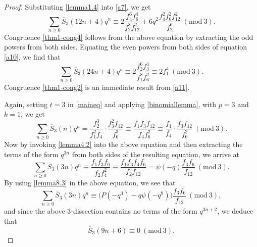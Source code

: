 \documentclass[10pt,a4paper]{amsart}
\begin{document}
\begin{proof}
Substituting \eqref{lemma1.4} into \eqref{a7}, we get
\begin{equation}
\sum_{n \geq 0} \overline{S}_{3}(12n+4) q^{n} \equiv  2 \dfrac{f_{4}^{6} f_{6}^{4}}{f_{2}^{8} f_{12}^{2}} + 6 q^{2}  \dfrac{f_{4}^{2} f_{6}^{2} f_{12}^{2}}{f_{2}^{6}}  \ (\mathrm{mod} \ 3).  \label{a10}
\end{equation}
Congruence \eqref{thm1-cong4} follows from the above equation by extracting the odd powers from both sides. Equating the even powers from both sides of equation \eqref{a10}, we find that
\begin{equation}
\sum_{n \geq 0} \overline{S}_{3}(24n+4) q^{n} \equiv  2 \dfrac{f_{2}^{6} f_{3}^{4}}{f_{1}^{8} f_{6}^{2}} \equiv 2f_{1}^{4}  \ (\mathrm{mod} \ 3).  \label{a11}
\end{equation}
Congruence \eqref{thm1-cong2} is an immediate result from \eqref{a11}.

Again, setting $t=3$ in \eqref{maineq} and applying \eqref{binomiallemma}, with $p=3$ and $k=1$, we get 
\begin{equation*}
\sum_{n \geq 0} \overline{S}_{3}(n) q^{n} = \frac{f_{2}^3 }{f_{1}^2 f_{4}} \cdot \frac{f_{3}^2 f_{12}}{f_{6}^3} \equiv \frac{f_{1} f_{3} f_{12}}{f_{4} f_{6}^2} \equiv \frac{f_{1}}{f_{4}} \cdot  \frac{f_{3} f_{12}}{f_{6}^2} \ (\mathrm{mod} \ 3).
\end{equation*}
Now by invoking \eqref{lemma4.2} into the above equation and then extracting the terms of the form $q^{3n}$ from both sides of the resulting equation, we arrive at
\begin{equation*}
\sum_{n \geq 0} \overline{S}_{3}(3n) q^{n} \equiv \frac{f_1 f_3 f_6}{f_2 f_4^2} \equiv \frac{f_1 f_3 f_4 f_6}{f_2 f_{12}} = \psi(-q) \frac{f_3 f_6}{f_{12}} \ (\mathrm{mod} \ 3).
\end{equation*}
By using \eqref{lemma8.3} in the above equation, we see that
\begin{equation}
\sum_{n \geq 0} \overline{S}_{3}(3n) q^{n} \equiv\big( P(-q^3) - q \psi(-q^9) \big) \frac{f_3 f_6}{f_{12}} \ (\mathrm{mod} \ 3),  \label{sel01}
\end{equation}
and since the above $3$-dissection contains no terms of the form $q^{3n+2}$, we deduce that
\begin{equation*}
\overline{S}_{3}(9n+6)  \equiv 0 \ (\mathrm{mod} \ 3).
\end{equation*}


\end{proof}
\end{document}
